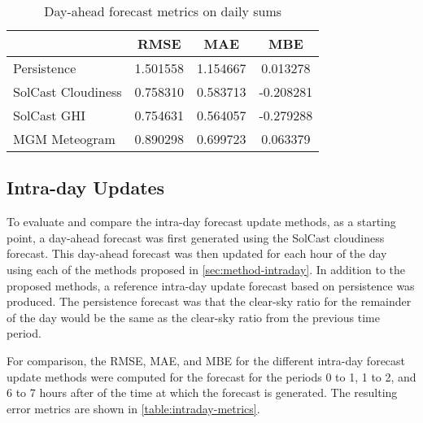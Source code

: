 \begin{table}[!t]
	\centering
	\caption{Day-ahead forecast metrics on daily sums}
	\label{table:dayahead-metrics-sum}
	\begin{tabular}{lS[table-format=1.3]S[table-format=1.3]S[table-format=-1.3]}
		\toprule
		                       &   {RMSE}   &   {MAE}    &    {MBE}    \\
        \midrule
		Persistence & 1.501558 & 1.154667 & 0.013278 \\
		SolCast Cloudiness & 0.758310 & 0.583713 & -0.208281 \\
		SolCast GHI & 0.754631 & 0.564057 & -0.279288 \\
		MGM Meteogram & 0.890298 & 0.699723 & 0.063379 \\
		\bottomrule
	\end{tabular}
\end{table}


\subsection{Intra-day Updates}

To evaluate and compare the intra-day forecast update methods,
as a starting point, a day-ahead forecast was first generated using the
SolCast cloudiness forecast.
This day-ahead forecast was then updated for each hour of the day using each of the methods proposed in \cref{sec:method-intraday}.
In addition to the proposed methods, a reference intra-day update forecast based on persistence was produced.
The persistence forecast was that the clear-sky ratio for the remainder of the day would be the same as the clear-sky ratio from the previous time period.

For comparison, the RMSE, MAE, and MBE for the different intra-day forecast update methods were computed
for the forecast for the periods 0 to 1, 1 to 2, and 6 to 7 hours after of the time at which the forecast is generated.
The resulting error metrics are shown in \cref{table:intraday-metrics}.

